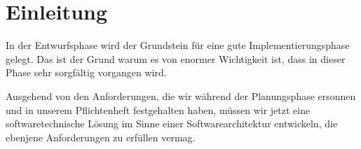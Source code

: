 \section{Einleitung}

In der Entwurfsphase wird der Grundstein für eine gute Implementierungsphase gelegt. Das ist der Grund warum es von enormer Wichtigkeit ist, dass in dieser Phase sehr sorgfältig vorgangen wird.

Ausgehend von den Anforderungen, die wir während der Planungsphase ersonnen und in unserem Pflichtenheft festgehalten haben, müssen wir jetzt eine softwaretechnische Lösung im Sinne einer Softwarearchitektur entwickeln, die ebenjene Anforderungen zu erfüllen vermag.